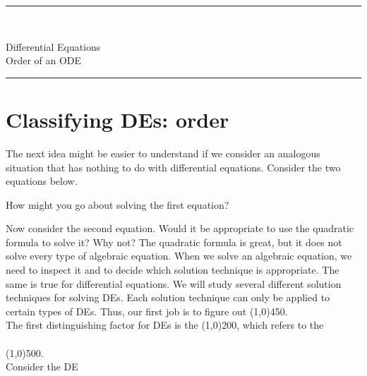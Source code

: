 \documentclass[12pt]{article}
\newcommand{\<}{\langle}
\renewcommand{\>}{\rangle}
\begin{document}
\noindent\rule{7in}{0.4pt}\\
\begin{center}
{\sc Differential Equations\\
Order of an ODE}
\end{center}
\noindent\rule{7in}{0.4pt}
\section*{Classifying DEs:  order}
\doublespacing
\noindent  The next idea might be easier to understand if we consider an analogous situation that has nothing
to do with differential equations.  Consider the
two equations below.\\ \vspace{0.5cm}

\noindent  How might you go about solving the first equation? \\ \vspace{0.5in}

\noindent Now consider the second equation.  Would it be appropriate to use the quadratic formula to solve it?
Why not?  The quadratic formula is great, but it does not solve every type of algebraic equation.  When we 
solve an algebraic equation, we need to inspect it and to decide which solution technique is appropriate.  
The same is true for differential equations.  We will study several different solution techniques for solving 
DEs.  Each solution technique can only be applied to certain types of DEs.  Thus, our first job is to figure
out %
\line(1,0){450}.\\

\noindent  The first distinguishing factor for DEs is the %
\line(1,0){200}, which refers to the \\ \\%
\line(1,0){500}.\\

  Consider the DE\\ \\
\end{document}
